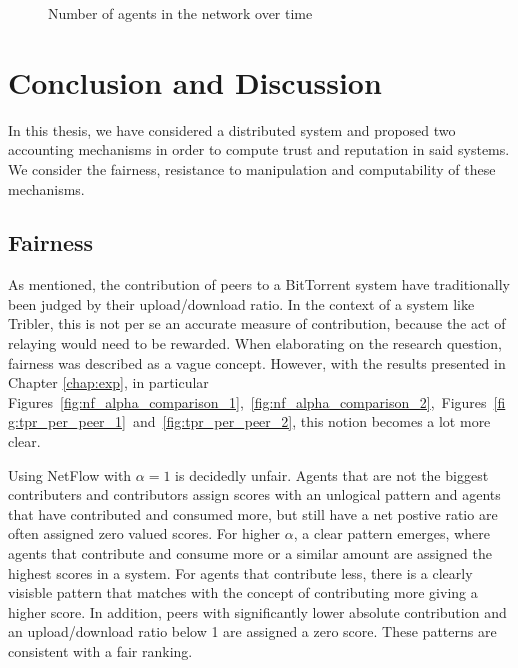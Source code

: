 \documentclass[a4paper,11pt]{book}
\theoremstyle{definition}
\begin{document}
\begin{figure}[ht]
    \centering
    
    \caption{Number of agents in the network over time}
    \label{fig:evolution}
\end{figure}








\chapter{Conclusion and Discussion}
\label{chap:conclusion}

In this thesis, we have considered a distributed system and proposed two accounting mechanisms
in order to compute trust and reputation in said systems. We consider the fairness, resistance
to manipulation and computability of these mechanisms.

\section{Fairness}

As mentioned, the contribution of peers to a BitTorrent system have traditionally been judged by their
upload/download ratio. In the context of a system like Tribler, this is not per se an accurate
measure of contribution, because the act of relaying would need to be rewarded. When elaborating on
the research question, fairness was described as a vague concept. However, with the results
presented in Chapter \ref{chap:exp}, in particular 
Figures~\ref{fig:nf_alpha_comparison_1},~\ref{fig:nf_alpha_comparison_2},~Figures~\ref{fig:tpr_per_peer_1}~and~\ref{fig:tpr_per_peer_2},
this notion becomes a lot more clear. 

Using NetFlow with $\alpha=1$ is decidedly unfair. 
Agents that are not the biggest contributers and contributors assign scores with an unlogical pattern and
agents that have contributed and consumed more, but still have a net postive ratio are often assigned
zero valued scores. For higher $\alpha$, a clear pattern emerges, where agents that contribute
and consume more or a similar amount are assigned the highest scores in a system. For agents
that contribute less, there is a clearly visisble pattern that matches with the concept of 
contributing more giving a higher score. In addition, peers with significantly lower absolute contribution
and an upload/download ratio below 1 are assigned a zero score. These patterns are consistent with a fair
ranking.
\end{document}
